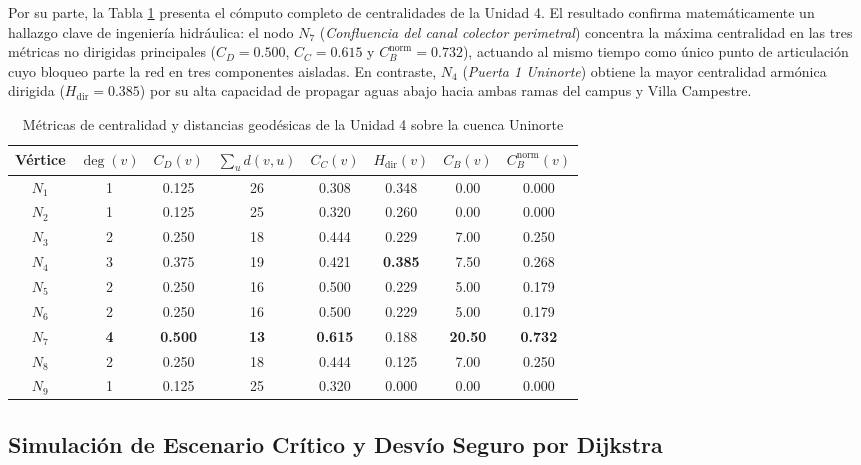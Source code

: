 \documentclass[12pt,letterpaper]{article}
\begin{document}
Por su parte, la Tabla \ref{tab:centralidades} presenta el cómputo completo de centralidades de la Unidad 4. El resultado confirma matemáticamente un hallazgo clave de ingeniería hidráulica: el nodo $N_7$ (\textit{Confluencia del canal colector perimetral}) concentra la máxima centralidad en las tres métricas no dirigidas principales ($C_D = 0.500$, $C_C = 0.615$ y $C_B^{\text{norm}} = 0.732$), actuando al mismo tiempo como único punto de articulación cuyo bloqueo parte la red en tres componentes aisladas. En contraste, $N_4$ (\textit{Puerta 1 Uninorte}) obtiene la mayor centralidad armónica dirigida ($H_{\text{dir}} = 0.385$) por su alta capacidad de propagar aguas abajo hacia ambas ramas del campus y Villa Campestre.

\begin{table}[H]
    \centering
    \singlespacing
    \small
    \caption{Métricas de centralidad y distancias geodésicas de la Unidad 4 sobre la cuenca Uninorte}
    \label{tab:centralidades}
    \begin{tabular}{@{}cccccccc@{}}
        \toprule
        \textbf{Vértice} & $\deg(v)$ & $C_D(v)$ & $\sum_u d(v,u)$ & $C_C(v)$ & $H_{\text{dir}}(v)$ & $C_B(v)$ & $C_B^{\text{norm}}(v)$ \\
        \midrule
        $N_1$ & 1 & 0.125 & 26 & 0.308 & 0.348 &  0.00 & 0.000 \\
        $N_2$ & 1 & 0.125 & 25 & 0.320 & 0.260 &  0.00 & 0.000 \\
        $N_3$ & 2 & 0.250 & 18 & 0.444 & 0.229 &  7.00 & 0.250 \\
        $N_4$ & 3 & 0.375 & 19 & 0.421 & \textbf{0.385} &  7.50 & 0.268 \\
        $N_5$ & 2 & 0.250 & 16 & 0.500 & 0.229 &  5.00 & 0.179 \\
        $N_6$ & 2 & 0.250 & 16 & 0.500 & 0.229 &  5.00 & 0.179 \\
        $N_7$ & \textbf{4} & \textbf{0.500} & \textbf{13} & \textbf{0.615} & 0.188 & \textbf{20.50} & \textbf{0.732} \\
        $N_8$ & 2 & 0.250 & 18 & 0.444 & 0.125 &  7.00 & 0.250 \\
        $N_9$ & 1 & 0.125 & 25 & 0.320 & 0.000 &  0.00 & 0.000 \\
        \bottomrule
    \end{tabular}
\end{table}

\subsection{Simulación de Escenario Crítico y Desvío Seguro por Dijkstra}
\end{document}
